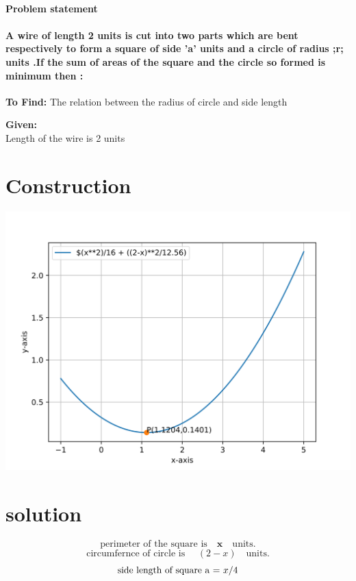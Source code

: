 \documentclass[10pt, a4paper]{article}
\title{\mytitle}
\author{\myauthor\hspace{1em}\\\contact\\FWC22086\hspace{6.5em}IITH\hspace{0.5em}\mymodule\hspace{6em}MATRICES}
\date{}
\let\vec\mathbf
\begin{document}
\maketitle
\paragraph*{\large Problem statement}
\paragraph*{A wire of length 2 units is cut into two parts which are bent respectively to form a square of side 'a' units and a circle of radius ;r; units .If the sum of areas of the square and the circle so formed is minimum then :}
\textbf{To Find:} 
The relation between the radius of circle and side length 

\noindent \textbf{Given:} \\
Length of the wire is 2 units
\section{Construction}
   \begin{center}
  \includegraphics[scale=0.5]{optii.png}
    \end{center}
\section{solution}
\begin{equation}
\text{perimeter of the square is} \quad \vec{x} \quad \text{units} .
\end{equation} 
\begin{equation}
\text{circumfernce of circle is }\quad(2-x) \quad\text{units}.
\end{equation} 
\begin{equation}
\text{side length of square a = } x/4 \\
\label{eq-1}
\end{equation}
\end{document}
